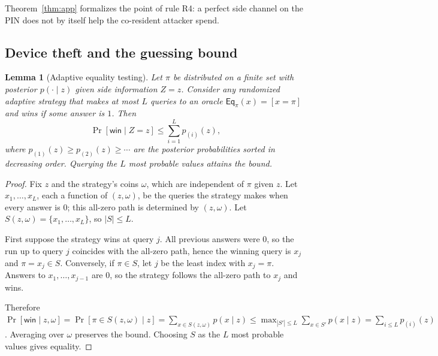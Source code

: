 \documentclass[11pt]{article}
\newtheorem{lemma}{Lemma}
\theoremstyle{remark}
\begin{document}
Theorem~\ref{thm:app} formalizes the point of rule R4: a perfect side channel on the PIN does not by itself help the co-resident attacker spend.

\subsection{Device theft and the guessing bound}

\begin{lemma}[Adaptive equality testing]
\label{lem:guess}
Let $\pi$ be distributed on a finite set with posterior $p(\cdot\mid z)$ given side information $Z = z$. Consider any randomized adaptive strategy that makes at most $L$ queries to an oracle $\mathsf{Eq}_\pi(x) = [x = \pi]$ and wins if some answer is $1$. Then
\[
\Pr[\mathsf{win} \mid Z = z] \le \sum_{i=1}^{L} p_{(i)}(z),
\]
where $p_{(1)}(z) \ge p_{(2)}(z) \ge \cdots$ are the posterior probabilities sorted in decreasing order. Querying the $L$ most probable values attains the bound.
\end{lemma}
\begin{proof}
Fix $z$ and the strategy's coins $\omega$, which are independent of $\pi$ given $z$. Let $x_1, \dots, x_L$, each a function of $(z,\omega)$, be the queries the strategy makes when every answer is $0$; this all-zero path is determined by $(z,\omega)$. Let $S(z,\omega) = \{x_1,\dots,x_L\}$, so $|S| \le L$.

First suppose the strategy wins at query $j$. All previous answers were $0$, so the run up to query $j$ coincides with the all-zero path, hence the winning query is $x_j$ and $\pi = x_j \in S$. Conversely, if $\pi \in S$, let $j$ be the least index with $x_j = \pi$. Answers to $x_1,\dots,x_{j-1}$ are $0$, so the strategy follows the all-zero path to $x_j$ and wins.

Therefore $\Pr[\mathsf{win}\mid z,\omega] = \Pr[\pi \in S(z,\omega)\mid z] = \sum_{x \in S(z,\omega)} p(x\mid z) \le \max_{|S'| \le L} \sum_{x\in S'} p(x\mid z) = \sum_{i \le L} p_{(i)}(z)$. Averaging over $\omega$ preserves the bound. Choosing $S$ as the $L$ most probable values gives equality.
\end{proof}
\end{document}
